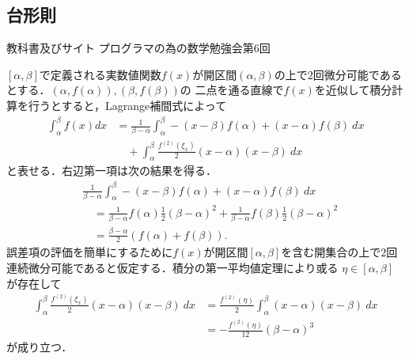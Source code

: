 \documentclass[a4j,papersize,disablejfam,slide,14pt]{jsarticle}
\begin{document}
\subsection{台形則}
	\begin{itembox}[l]{教科書及びサイト}
    	{\rm プログラマの為の数学勉強会第6回\cite{programmer_math}}
    \end{itembox}
	$[\alpha, \beta]$で定義される実数値関数$f(x)$が開区間$(\alpha, \beta)$の上で$2$回微分可能であるとする．$(\alpha, f(\alpha)), (\beta, f(\beta))$の
    二点を通る直線で$f(x)$を近似して積分計算を行うとすると，{\rm Lagrange}補間式によって
    \begin{align}
    	\int_{\alpha}^{\beta} f(x) dx &= \frac{1}{\beta - \alpha} \int_{\alpha}^{\beta} -(x-\beta)f(\alpha) + (x-\alpha)f(\beta)\ dx \\
        &\quad+ \int_{\alpha}^{\beta} \frac{f^{(2)}(\xi_x)}{2}(x-\alpha)(x-\beta)\ dx
    \end{align}
    と表せる．右辺第一項は次の結果を得る．
    \begin{align}
    	&\frac{1}{\beta - \alpha} \int_{\alpha}^{\beta} -(x-\beta)f(\alpha) + (x-\alpha)f(\beta)\ dx \\
        &\quad= \frac{1}{\beta - \alpha} f(\alpha) \frac{1}{2} (\beta - \alpha)^2 + \frac{1}{\beta - \alpha} f(\beta) \frac{1}{2} (\beta - \alpha)^2 \\
        &\quad= \frac{\beta - \alpha}{2} \left( f(\alpha) + f(\beta) \right).
    \end{align}
    誤差項の評価を簡単にするために$f(x)$が開区間$[\alpha, \beta]$を含む開集合の上で$2$回連続微分可能であると仮定する．積分の第一平均値定理により或る
    $\eta \in [\alpha, \beta]$が存在して
    \begin{align}
    	\int_{\alpha}^{\beta} \frac{f^{(2)}(\xi_x)}{2}(x-\alpha)(x-\beta)\ dx &= \frac{f^{(2)}(\eta)}{2} \int_{\alpha}^{\beta} (x-\alpha)(x-\beta)\ dx \\
        &= -\frac{f^{(2)}(\eta)}{12} (\beta - \alpha)^3
    \end{align}
    が成り立つ．
\end{document}

